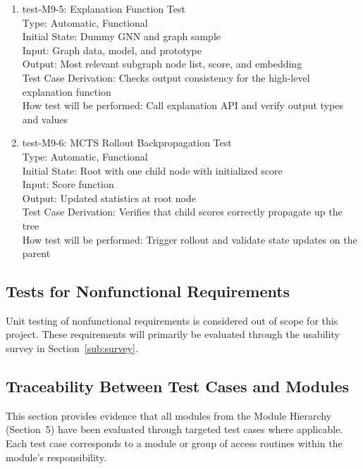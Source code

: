 \documentclass[12pt, titlepage]{article}
\begin{document}
\begin{enumerate}
\item{test-M9-5: Explanation Function Test\\}
Type: Automatic, Functional \\
Initial State: Dummy GNN and graph sample \\
Input: Graph data, model, and prototype \\
Output: Most relevant subgraph node list, score, and embedding \\
Test Case Derivation: Checks output consistency for the high-level explanation function \\
How test will be performed: Call explanation API and verify output types and values


\item{test-M9-6: MCTS Rollout Backpropagation Test\\}
Type: Automatic, Functional \\
Initial State: Root with one child node with initialized score \\
Input: Score function \\
Output: Updated statistics at root node \\
Test Case Derivation: Verifies that child scores correctly propagate up the tree \\
How test will be performed: Trigger rollout and validate state updates on the parent
\end{enumerate}


\subsection{Tests for Nonfunctional Requirements}
Unit testing of nonfunctional requirements is considered out of scope for this project. These requirements will primarily be evaluated through the usability survey in Section~\ref{sub:survey}.

\subsection{Traceability Between Test Cases and Modules}
\label{sec:trace-test-modules}

This section provides evidence that all modules from the Module Hierarchy (Section~5) have been evaluated through targeted test cases where applicable. Each test case corresponds to a module or group of access routines within the module's responsibility.
\end{document}

